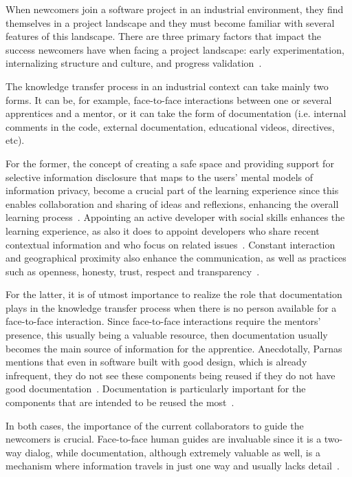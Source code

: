 \documentclass[12pt, letterpaper]{article}
\begin{document}
When newcomers join a software project in an industrial environment, they find themselves in a project
landscape and they must become familiar with several features of this landscape.
There are three primary factors that impact the 
success newcomers have when facing a project landscape: early experimentation, internalizing structure
and culture, and progress validation~\cite{Dagenais10}.

The knowledge transfer process in an industrial context can take mainly two forms. It can be, for example,
face-to-face interactions between one or several apprentices and a mentor, or it can take the form of documentation 
(i.e. internal comments in the code, external documentation, educational videos, directives, etc). 

For the 
former, the concept of creating a safe space and providing support for selective information disclosure that
maps to the users' mental models of information privacy, become a crucial part of the learning
experience since this enables collaboration and sharing of ideas and reflexions, enhancing
the overall learning process~\cite{Razavi06}. Appointing an active developer with social skills
enhances the learning experience, as also it does to appoint developers who share recent
contextual information and who focus on related issues~\cite{Steinmacher12}. Constant interaction
and geographical proximity also enhance the communication, as well as practices such as 
openness, honesty, trust, respect and transparency~\cite{Whitworth06}. 

For the latter,
it is of utmost importance to realize the role that documentation plays in the knowledge transfer
process when there is no person available for a face-to-face interaction. Since face-to-face interactions
require the mentors' presence, this usually being a valuable resource, then documentation usually
becomes the main source of information for the apprentice. Anecdotally, Parnas mentions that even
in software built with good design, which is already infrequent, they do not see these components being
reused if they do not have good documentation~\cite{brooks95}. Documentation is particularly important 
for the components that are intended to be reused the most~\cite{monperrus11}.

In both cases, the importance of the current collaborators to guide the newcomers is crucial.
Face-to-face human guides are invaluable since it is a two-way dialog, while documentation,
although extremely valuable as well, is a mechanism
where information travels in just one way and usually lacks detail~\cite{Dagenais10}.
\end{document}

